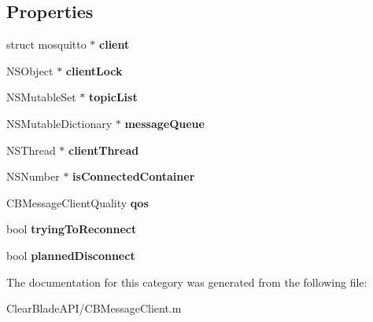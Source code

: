 \subsection*{Properties}
\begin{DoxyCompactItemize}
\item 
\hypertarget{category_c_b_message_client_07_08_a6dd8044dd2d87c74a8274dd2d772d18c}{struct mosquitto $\ast$ {\bfseries client}}\label{category_c_b_message_client_07_08_a6dd8044dd2d87c74a8274dd2d772d18c}

\item 
\hypertarget{category_c_b_message_client_07_08_a8ea5e9fc7bd6109f0e0bf0a5149ce281}{N\+S\+Object $\ast$ {\bfseries client\+Lock}}\label{category_c_b_message_client_07_08_a8ea5e9fc7bd6109f0e0bf0a5149ce281}

\item 
\hypertarget{category_c_b_message_client_07_08_a352f0fd7c3c5b009801f1d5164fe684f}{N\+S\+Mutable\+Set $\ast$ {\bfseries topic\+List}}\label{category_c_b_message_client_07_08_a352f0fd7c3c5b009801f1d5164fe684f}

\item 
\hypertarget{category_c_b_message_client_07_08_a084c1c0326a36184f673f698eb82cd34}{N\+S\+Mutable\+Dictionary $\ast$ {\bfseries message\+Queue}}\label{category_c_b_message_client_07_08_a084c1c0326a36184f673f698eb82cd34}

\item 
\hypertarget{category_c_b_message_client_07_08_ab510d95792c9d50028d6fa2d34a1a995}{N\+S\+Thread $\ast$ {\bfseries client\+Thread}}\label{category_c_b_message_client_07_08_ab510d95792c9d50028d6fa2d34a1a995}

\item 
\hypertarget{category_c_b_message_client_07_08_a481825e10342415caf9e0f592b606bc5}{N\+S\+Number $\ast$ {\bfseries is\+Connected\+Container}}\label{category_c_b_message_client_07_08_a481825e10342415caf9e0f592b606bc5}

\item 
\hypertarget{category_c_b_message_client_07_08_a7f10d284507cb889192b0a8ea8de88cc}{C\+B\+Message\+Client\+Quality {\bfseries qos}}\label{category_c_b_message_client_07_08_a7f10d284507cb889192b0a8ea8de88cc}

\item 
\hypertarget{category_c_b_message_client_07_08_a922f0d8bb0747542d455604eb0d3f60f}{bool {\bfseries trying\+To\+Reconnect}}\label{category_c_b_message_client_07_08_a922f0d8bb0747542d455604eb0d3f60f}

\item 
\hypertarget{category_c_b_message_client_07_08_a67e34e1b763d430038a54539611f5742}{bool {\bfseries planned\+Disconnect}}\label{category_c_b_message_client_07_08_a67e34e1b763d430038a54539611f5742}

\end{DoxyCompactItemize}


The documentation for this category was generated from the following file\+:\begin{DoxyCompactItemize}
\item 
Clear\+Blade\+A\+P\+I/C\+B\+Message\+Client.\+m\end{DoxyCompactItemize}
